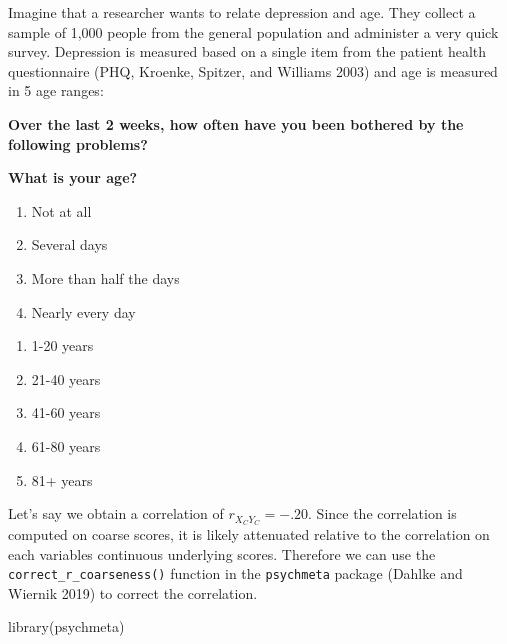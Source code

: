 \documentclass[
  letterpaper,
  DIV=11,
  numbers=noendperiod]{scrreprt}
\newenvironment{Shaded}{}{}
\newcommand{\FunctionTok}[1]{\textcolor[rgb]{0.39,0.29,0.61}{#1}}
\newcommand{\NormalTok}[1]{\textcolor[rgb]{0.12,0.11,0.11}{#1}}
\providecommand{\tightlist}{%
  \setlength{\itemsep}{0pt}\setlength{\parskip}{0pt}}\usepackage{longtable,booktabs,array}
\begin{document}
\begin{tcolorbox}[enhanced jigsaw, toptitle=1mm, titlerule=0mm, arc=.35mm, breakable, colframe=quarto-callout-note-color-frame, title={Applied Example in R}, opacitybacktitle=0.6, opacityback=0, colbacktitle=quarto-callout-note-color!10!white, coltitle=black, bottomtitle=1mm, colback=white, bottomrule=.15mm, rightrule=.15mm, toprule=.15mm, leftrule=.75mm, left=2mm]

Imagine that a researcher wants to relate depression and age. They
collect a sample of 1,000 people from the general population and
administer a very quick survey. Depression is measured based on a single
item from the patient health questionnaire (PHQ, Kroenke, Spitzer, and
Williams 2003) and age is measured in 5 age ranges:

\textbf{Over the last 2 weeks, how often have you been bothered by the
following problems?}

\textbf{What is your age?}

\begin{enumerate}
\def\labelenumi{\arabic{enumi}.}
\tightlist
\item
  Not at all
\item
  Several days
\item
  More than half the days
\item
  Nearly every day
\end{enumerate}

\begin{enumerate}
\def\labelenumi{\arabic{enumi}.}
\tightlist
\item
  1-20 years
\item
  21-40 years
\item
  41-60 years
\item
  61-80 years
\item
  81+ years
\end{enumerate}

Let's say we obtain a correlation of \(r_{X_C Y_C}=-.20\). Since the
correlation is computed on coarse scores, it is likely attenuated
relative to the correlation on each variables continuous underlying
scores. Therefore we can use the \texttt{correct\_r\_coarseness()}
function in the \texttt{psychmeta} package (Dahlke and Wiernik 2019) to
correct the correlation.

\begin{Shaded}
\begin{Highlighting}[]
\FunctionTok{library}\NormalTok{(psychmeta)}


\end{Highlighting}
\end{Shaded}
\end{tcolorbox}
\end{document}
